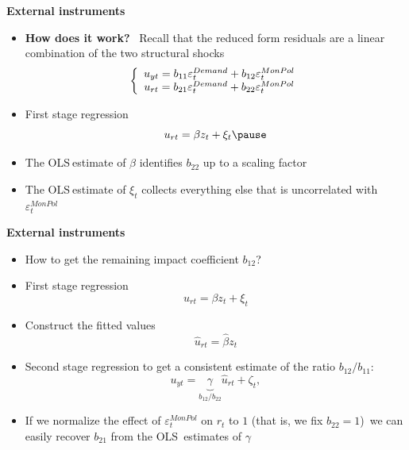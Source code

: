 \documentclass[10pt,english,t,aspectratio=169,ignorenonframetext]{beamer}
\begin{document}
\begin{frame}
{\textbf{External instruments}}\bigskip \medskip

\begin{itemize}
\item \textbf{How does it work?} \ Recall that the reduced form residuals
are a linear combination of the two structural shocks 
\begin{equation*}
\left\{ 
\begin{array}{c}
u_{yt}=b_{11}\varepsilon _{t}^{Demand}+b_{12}\varepsilon _{t}^{MonPol}{%
\mathbf{\medskip }} \\ 
u_{rt}=b_{21}\varepsilon _{t}^{Demand}+b_{22}\varepsilon _{t}^{MonPol}%
\end{array}%
\right. 
\end{equation*}

\item First stage regression 
\begin{equation*}
u_{rt}=\beta z_{t}+\xi _{t}\pause
\end{equation*}

\item The OLS$\ $estimate of $\beta $ identifies $b_{22}$ up to a scaling
factor\bigskip \smallskip 

\item The OLS$\ $estimate of $\xi _{t}$ collects everything else that is
uncorrelated with $\varepsilon _{t}^{MonPol}$
\end{itemize}
\end{frame}


\begin{frame}
{\textbf{External instruments\vspace{-.1cm}}}

\begin{itemize}
\item How to get the remaining impact coefficient $b_{12}$?\bigskip \pause

\item First stage regression 
\begin{equation*}
u_{rt}=\beta z_{t}+\xi _{t}
\end{equation*}

\item Construct the fitted values 
\begin{equation*}
\hat{u}_{rt}=\hat{\beta}z_{t}
\end{equation*}%
\pause

\item Second stage regression to get a consistent estimate of the ratio $%
b_{12}/b_{11}$:%
\begin{equation*}
u_{yt}=\underset{b_{12}/b_{22}}{\underbrace{\gamma }}\hat{u}_{rt}+\zeta _{t},
\end{equation*}%
\pause

\item If we normalize the effect of $\varepsilon _{t}^{MonPol}$ on $r_{t}$
to $1$ (that is, we fix $b_{22}=1$)\ we can easily recover $b_{21}$ from the
OLS\ estimates of $\gamma $
\end{itemize}
\end{frame}
\end{document}
